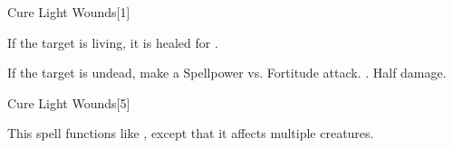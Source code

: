 \begin{spellsection}{Cure Light Wounds}[1]
    \begin{spellheader}
    \end{spellheader}
    \begin{spellcontent}
        \begin{spelltargetinginfo}
        \end{spelltargetinginfo}
        \begin{spelleffects}
            \spelleffect If the target is living, it is healed for .
            \begin{spellattacktriggered}{If the target is undead, make a Spellpower vs. Fortitude attack.}
                \spellsuccess {}.
                \spellfailure Half damage.
            \end{spellattacktriggered}
        \end{spelleffects}
    \end{spellcontent}
    \begin{spellfooter}
        \miscastrandom
    \end{spellfooter}
\end{spellsection}

\begin{spellsection}[Mass]{Cure Light Wounds}[5]
    \begin{spellheader}
    \end{spellheader}
    \begin{spellcontent}
        \begin{spelltargetinginfo}
        \end{spelltargetinginfo}
        \begin{spelleffects}
            \spellspecial This spell functions like , except that it affects multiple creatures.
        \end{spelleffects}
    \end{spellcontent}
    \begin{spellfooter}
        \miscastexplode
    \end{spellfooter}
\end{spellsection}

